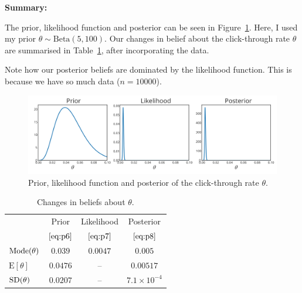 {{    
}

\textbf{Summary:} 

The prior, likelihood function and posterior can be seen in Figure~\ref{fig:clickthrough}. Here, I used my prior $\theta \sim \text{Beta}(5,100)$. Our changes in belief about the click-through rate $\theta$ are summarised in Table~\ref{tab:clickthrough}, after incorporating the data.

Note how our posterior beliefs are dominated by the likelihood function. This is because we have so much data ($n = 10000$). 

\begin{figure}[h] 

\includegraphics{images/clickthroughrate_priorposterior.svg}
\caption{Prior, likelihood function and posterior of the click-through rate $\theta$.}

\label{fig:clickthrough}
\end{figure}}

\begin{table}[!h]
\bigskip

\begin{tabular}{|l|c|c|c|}
\cline{2-4}
\multicolumn{1}{c|}{~}& Prior & Likelihood & Posterior \\
\multicolumn{1}{c|}{~}& $\eqref{eq:p6}$ & $\eqref{eq:p7}$ & $\eqref{eq:p8}$ \\
\hline
$\textnormal{Mode}(\theta)$ & $0.039$ & $ 0.0047$ & $0.005$ \\
$\text{E}[\theta]$ & $0.0476$ & -- & $0.00517$ \\
$\textnormal{SD}(\theta)$ & $0.0207$ & -- & $7.1\times 10^{-4}$ \\
\hline
\end{tabular}
\caption{Changes in beliefs about $\theta$.}
\label{tab:clickthrough}

\end{table}

\clearpage

